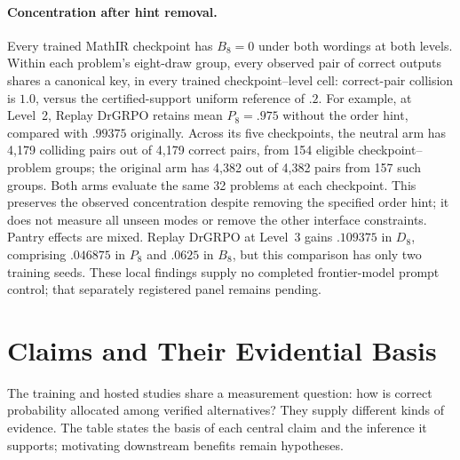 \documentclass{article}
\newcommand{\1}{\mathbf 1}
\theoremstyle{remark}
\theoremstyle{definition}
\theoremstyle{plain}
\begin{document}
\paragraph{Concentration after hint removal.}
Every trained MathIR checkpoint has $B_8=0$ under both wordings at both levels.
Within each problem's eight-draw group, every observed pair of correct
outputs shares a canonical key, in every trained checkpoint--level cell:
correct-pair collision is $1.0$, versus the
certified-support uniform reference of $.2$. For example, at Level~2, Replay
DrGRPO retains mean $P_8=.975$ without the order hint, compared with $.99375$
originally. Across its five checkpoints, the neutral arm has 4,179 colliding
pairs out of 4,179 correct pairs, from 154 eligible checkpoint--problem
groups; the original arm has 4,382 out of 4,382 pairs from 157 such groups.
Both arms evaluate the same 32 problems at each checkpoint. This preserves
the observed concentration despite removing the specified order hint; it does
not measure all unseen modes or remove the other interface constraints.
Pantry effects are mixed. Replay DrGRPO at Level~3 gains $.109375$ in $D_8$,
comprising $.046875$ in $P_8$ and $.0625$ in $B_8$, but this comparison has only
two training seeds. These local findings supply no completed frontier-model
prompt control; that separately registered panel remains pending.


\section{Claims and Their Evidential Basis}
\label{app:claim-basis}

The training and hosted studies share a measurement question: how is correct
probability allocated among verified alternatives? They supply different
kinds of evidence. The table states the basis of each central claim and the
inference it supports; motivating downstream benefits remain hypotheses.
\end{document}
